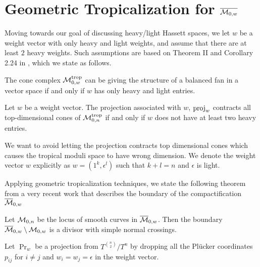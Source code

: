 \section{Geometric Tropicalization for $\overline{\mathcal{M}_{0, w}}$}
\label{sec:geometric-tropicalization-for-m-0w}
    Moving towards our goal of discussing heavy/light Hassett spaces,
    we let $w$ be a weight vector with only heavy and light weights,
    and assume that there are at least $2$ heavy weights. 
    Such assumptions are based on Theorem II and Corollary 2.24 in \citet{Cavalieri2014}, 
    which we state as follows.
    
    \begin{theorem}
    \label{thm:heavy-light-balanced-fan}
        The cone complex $\mathcal{M}_{0, w}^{\operatorname{trop}}$ can be giving the structure of a balanced fan in a vector space if and only if $w$ has only heavy and light entries.
    \end{theorem}
    
    \begin{corollary}
        Let $w$ be a weight vector.
        The projection associated with $w$, $\operatorname{proj}_w$ contracts all top-dimensional cones of $\mathcal{M}_{0, n}^{\operatorname{trop}}$ if and only if $w$ does not have at least two heavy entries. 
    \end{corollary}
    We want to avoid letting the projection contracts top dimensional cones
    which causes the tropical moduli space to have wrong dimension. 
    We denote the weight vector $w$ explicitly as $w = (1^k, \epsilon^l)$ such that $k + l = n$ and $\epsilon$ is light. 
    
    Applying geometric tropicalization techniques, we state the following theorem from a very recent work that describes the boundary of the compactification $\overline{\mathcal{M}}_{0, w}$
    \begin{theorem}
        Let $\mathcal{M}_{0, n}$ be the locus of smooth curves in $\overline{\mathcal{M}}_{0, w}$.
        Then the boundary $\overline{\mathcal{M}}_{0, w} \setminus \mathcal{M}_{0, w}$ is a divisor with simple normal crossings. 
    \end{theorem}
    
    \begin{definition}
    \label{def:Pr}
        Let $\Pr_w$ be a projection from $T^{\binom{n}{2}}/T^n$
        by dropping all the Pl\"{u}cker coordinates $p_{ij}$ for $i \ne j$ and $w_i = w_j = \epsilon$ in the weight vector.  
    \end{definition}
    
